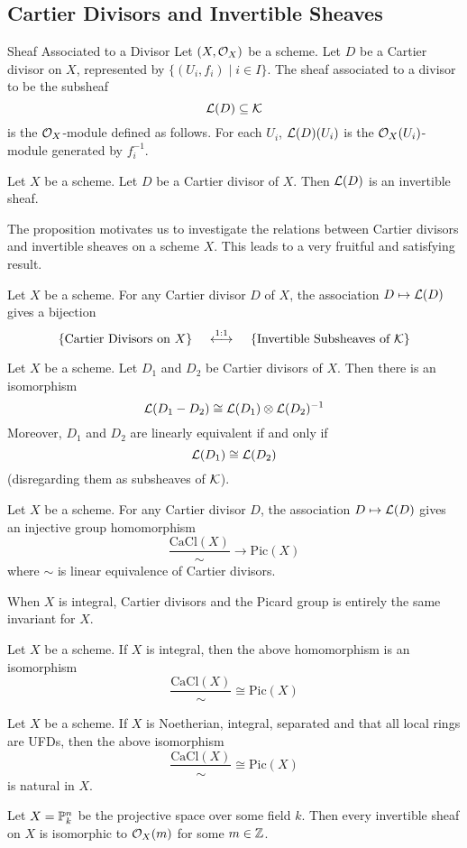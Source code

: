 \documentclass[a4paper]{article}
\begin{document}
\subsection{Cartier Divisors and Invertible Sheaves}
\begin{defn}{Sheaf Associated to a Divisor}{} Let $(X,\mathcal{O}_X)$ be a scheme. Let $D$ be a Cartier divisor on $X$, represented by $\{(U_i,f_i)\;|\;i\in I\}$. The sheaf associated to a divisor to be the subsheaf $$\mathcal{L}(D)\subseteq\mathcal{K}$$ is the $\mathcal{O}_X$-module defined as follows. For each $U_i$, $\mathcal{L}(D)(U_i)$ is the $\mathcal{O}_X(U_i)$-module generated by $f_i^{-1}$. 
\end{defn}

\begin{prp}{}{} Let $X$ be a scheme. Let $D$ be a Cartier divisor of $X$. Then $\mathcal{L}(D)$ is an invertible sheaf. 
\end{prp}

The proposition motivates us to investigate the relations between Cartier divisors and invertible sheaves on a scheme $X$. This leads to a very fruitful and satisfying result. 

\begin{thm}{}{} Let $X$ be a scheme. For any Cartier divisor $D$ of $X$, the association $D\mapsto\mathcal{L}(D)$ gives a bijection $$\{\text{Cartier Divisors on }X\}\;\;\;\;\overset{1:1}{\longleftrightarrow}\;\;\;\;\{\text{Invertible Subsheaves of }\mathcal{K}\}$$
\end{thm}

\begin{prp}{}{} Let $X$ be a scheme. Let $D_1$ and $D_2$ be Cartier divisors of $X$. Then there is an isomorphism $$\mathcal{L}(D_1-D_2)\cong\mathcal{L}(D_1)\otimes\mathcal{L}(D_2)^{-1}$$ Moreover, $D_1$ and $D_2$ are linearly equivalent if and only if $$\mathcal{L}(D_1)\cong\mathcal{L}(D_2)$$ (disregarding them as subsheaves of $\mathcal{K}$). 
\end{prp}

\begin{prp}{}{} Let $X$ be a scheme. For any Cartier divisor $D$, the association $D\mapsto\mathcal{L}(D)$ gives an injective group homomorphism $$\frac{\text{CaCl}(X)}{\sim}\to\text{Pic}(X)$$ where $\sim$ is linear equivalence of Cartier divisors. 
\end{prp}

When $X$ is integral, Cartier divisors and the Picard group is entirely the same invariant for $X$. 

\begin{thm}{}{} Let $X$ be a scheme. If $X$ is integral, then the above homomorphism is an isomorphism $$\frac{\text{CaCl}(X)}{\sim}\cong\text{Pic}(X)$$
\end{thm}

\begin{crl}{}{} Let $X$ be a scheme. If $X$ is Noetherian, integral, separated and that all local rings are UFDs, then the above isomorphism $$\frac{\text{CaCl}(X)}{\sim}\cong\text{Pic}(X)$$ is natural in $X$. 
\end{crl}

\begin{crl}{}{} Let $X=\mathbb{P}_k^n$ be the projective space over some field $k$. Then every invertible sheaf on $X$ is isomorphic to $\mathcal{O}_X(m)$ for some $m\in\mathbb{Z}$. 
\end{crl}
\end{document}
